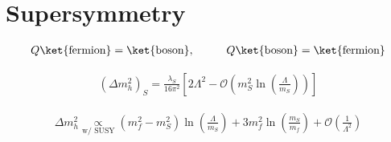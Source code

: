 \section{Supersymmetry}
\label{sec:susy}

\begin{align}
    Q \ket{\text{fermion}} = \ket{\text{boson}}, \hspace{1cm} Q \ket{\text{boson}} = \ket{\text{fermion}}
    \label{eq:susy_operator}
\end{align}

\begin{align}
    \left( \Delta m_h^2 \right)_{S} = \frac{\lambda_S}{16 \pi^2} \left[ 2 \Lambda^2 - \mathcal{O} \left( m_S^2 \ln \left( \frac{\Lambda}{m_S} \right) \right) \right]
    \label{eq:higgs_corr_susy}
\end{align}

\begin{align}
    \Delta m_h^2 \underset{\text{w/ SUSY}}{\propto} \left( m_f^2 - m_S^2 \right) \ln \left( \frac{\Lambda}{m_S} \right) + 3 m_f^2 \ln \left( \frac{m_S}{m_f} \right) + \mathcal{O} \left( \frac{1}{\Lambda^2} \right)
    \label{eq:higgs_corr_fixed}
\end{align}


